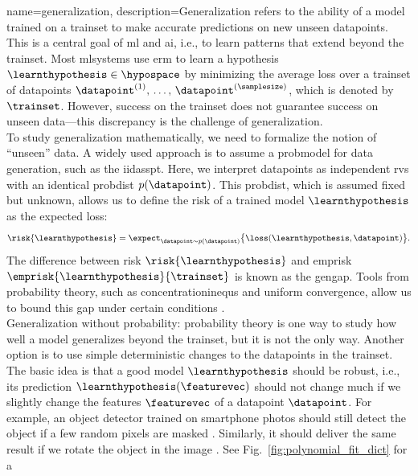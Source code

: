 {name={generalization},
	description={Generalization refers to the ability of a \gls{model} trained on a \gls{trainset} to make accurate 
		\glspl{prediction} on new unseen \glspl{datapoint}. This is a central goal of \gls{ml} and \gls{ai}, i.e., 
		to learn patterns that extend beyond the \gls{trainset}. Most \glspl{mlsystem}  
		use \gls{erm} to learn a \gls{hypothesis} $\learnthypothesis \in \hypospace$ by minimizing 
		the average \gls{loss} over a \gls{trainset} of \glspl{datapoint} $\datapoint^{(1)}, \,\ldots, \,\datapoint^{(\samplesize)}$, 
		which is denoted by $\trainset$. However, success on the \gls{trainset} does not guarantee success on 
		unseen \gls{data}—this discrepancy is the challenge of generalization. \\ To study generalization 
		mathematically, we need to formalize the notion of ``unseen'' \gls{data}. A widely used 
		approach is to assume a \gls{probmodel} for \gls{data} generation, such as the \gls{iidasspt}. 
		Here, we interpret \glspl{datapoint} as independent \glspl{rv} with an identical 
		\gls{probdist} $p(\datapoint)$. This \gls{probdist}, which is assumed fixed but unknown, 
		allows us to define the \gls{risk} of a trained \gls{model} $\learnthypothesis$ as the expected \gls{loss}:
		\[
		\risk{\learnthypothesis}=\expect_{\datapoint \sim p(\datapoint)} \big\{ \loss(\learnthypothesis, \datapoint) \big\}.
		\]
		The difference between \gls{risk} $\risk{\learnthypothesis}$ and \gls{emprisk} $\emprisk{\learnthypothesis}{\trainset}$ 
		is known as the \gls{gengap}. Tools from \gls{probability} theory, such as \glspl{concentrationinequ} 
		and uniform \gls{convergence}, allow us to bound this gap under certain conditions \cite{ShalevMLBook}.\\
		Generalization without \gls{probability}: \Gls{probability} theory is one way to study how well a 
		\gls{model} generalizes beyond the \gls{trainset}, but it is not the only way. Another option is to use 
		simple deterministic changes to the \glspl{datapoint} in the \gls{trainset}. The basic idea is that a 
		good \gls{model} $\learnthypothesis$ should be robust, i.e., its \gls{prediction} $\learnthypothesis(\featurevec)$ 
		should not change much if we slightly change the \glspl{feature} $\featurevec$ of a \gls{datapoint} $\datapoint$. 
		For example, an object detector trained on smartphone photos should still detect the object if a few 
		random pixels are masked \cite{OnePixelAttack}. Similarly, it should deliver the same result if we rotate 
		the object in the image \cite{MallatUnderstandingDeepLearning}. See Fig.\ \ref{fig:polynomial_fit_dict} for a 
}}

